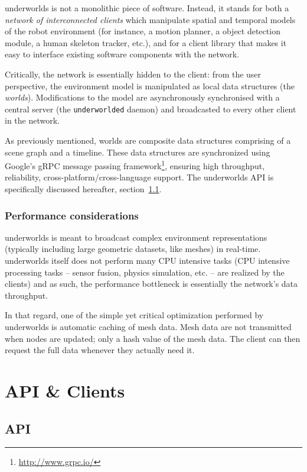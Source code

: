 \documentclass[letterpaper, 10 pt, conference]{ieeeconf}  %
\newcommand{\uwds}{{\sc underworlds}\xspace}
\begin{document}
\uwds is not a monolithic piece of software. Instead, it stands for both a
\emph{network of interconnected clients} which manipulate spatial and temporal
models of the robot environment (for instance, a motion planner, a object
detection module, a human skeleton tracker, etc.), and for a {client library}
that makes it easy to interface existing software components with the network.

Critically, the network is essentially hidden to the client: from the user
perspective, the environment model is manipulated as local data structures (the
\emph{worlds}). Modifications to the model are asynchronously synchronised with
a central server (the {\tt underworlded} daemon) and broadcasted to every other
client in the network.

As previously mentioned, worlds are composite data structures comprising of a
scene graph and a timeline. These data structures are synchronized using
Google's gRPC message passing framework\footnote{\url{http://www.grpc.io/}}, ensuring
high throughput, reliability, cross-platform/cross-language support. The \uwds
API is specifically discussed hereafter, section~\ref{api}.


\subsubsection*{Performance considerations}

\uwds is meant to broadcast complex environment representations (typically
including large geometric datasets, like meshes) in real-time. \uwds itself does
not perform many CPU intensive tasks (CPU intensive processing tasks -- sensor fusion, physics
simulation, etc. -- are realized by the clients) and as such, the performance
bottleneck is essentially the network's data throughput.

In that regard, one of the simple yet critical optimization performed by \uwds
is automatic caching of mesh data. Mesh data are not transmitted when nodes are
updated; only a hash value of the mesh data. The client can then request the
full data whenever they actually need it.



\section{API \& Clients}

\subsection{API}
\label{api}
\end{document}
